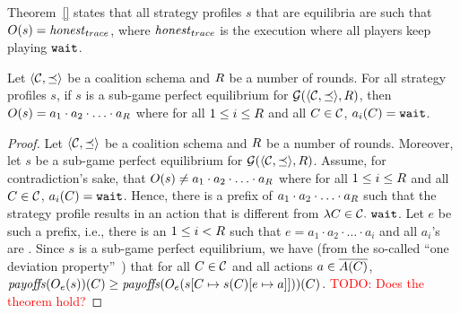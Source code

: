 Theorem~\ref{} states that all strategy profiles $s$ that are equilibria are such that $O(s) = \honest_{trace}$, where $\honest_{trace}$ is the execution where all players keep playing $\wait$.

\begin{theorem}
Let $\tup{\coalitionSchema, \preceq}$ be a coalition schema and $\rounds$ be a number of rounds.
%
For all strategy profiles $s$, 
%
if $s$ is a sub-game perfect equilibrium for $\game{\tup{\coalitionSchema, \preceq}, \rounds}$, then
%
$\outcome{s} = a_1 \cdot a_2 \cdot \ldots \cdot a_{\rounds}$ where for all $1 \leq i \leq \rounds$ and all $C \in \coalitionSchema$, $a_i(C) = \wait$.
\end{theorem}

\begin{proof}
Let $\tup{\coalitionSchema, \preceq}$ be a coalition schema and $\rounds$ be a number of rounds.
%
Moreover, let $s$ be a sub-game perfect equilibrium for $\game{\tup{\coalitionSchema, \preceq}, \rounds}$.
%
Assume, for contradiction's sake, that $\outcome{s} \neq a_1 \cdot a_2 \cdot \ldots \cdot a_{\rounds}$ where for all $1 \leq i \leq \rounds$ and all $C \in \coalitionSchema$, $a_i(C) = \wait$.
%
Hence, there is a prefix of $a_1 \cdot a_2 \cdot \ldots \cdot a_{\rounds}$ such that the strategy profile results in an action that is different from $\lambda C \in \coalitionSchema.\ \wait$.
%
Let $e$ be such a prefix, i.e., there is an $1 \leq i < \rounds$ such that $e =  a_1 \cdot a_2 \cdot \ldots \cdot a_{i}$ and all $a_i$'s are .
%
Since $s$ is a sub-game perfect equilibrium, we have (from the so-called ``one deviation property''~\cite[Lemma 98.2]{osborne1994course}) that for all $C \in \coalitionSchema$ and all actions $a \in \coalitionActions{C}$, $\payoffs(\subgameOutcome{s}{e})(C) \geq \payoffs(\subgameOutcome{s[C \mapsto s(C)[e \mapsto a]]}{e})(C)$.
%
\textcolor{red}{TODO: Does the theorem hold?}
\end{proof}






